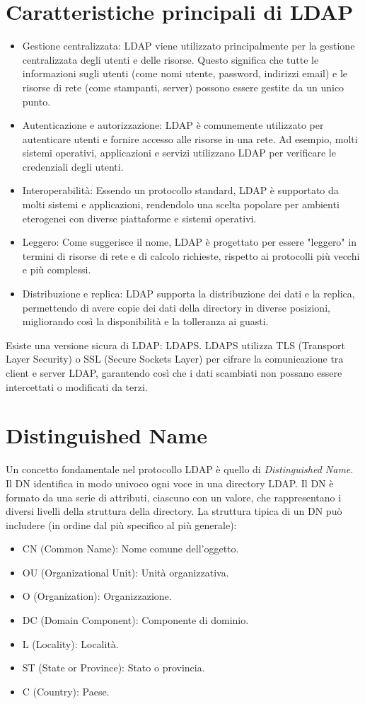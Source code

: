\documentclass[12pt]{report}
\begin{document}
\section{Caratteristiche principali di LDAP}
\begin{itemize}
    \item Gestione centralizzata: LDAP viene utilizzato principalmente per la gestione centralizzata degli utenti e delle risorse. Questo significa che tutte le informazioni sugli utenti (come nomi utente, password, indirizzi email) e le risorse di rete (come stampanti, server) possono essere gestite da un unico punto.
    \item Autenticazione e autorizzazione: LDAP è comunemente utilizzato per autenticare utenti e fornire accesso alle risorse in una rete. Ad esempio, molti sistemi operativi, applicazioni e servizi utilizzano LDAP per verificare le credenziali degli utenti.
    \item Interoperabilità: Essendo un protocollo standard, LDAP è supportato da molti sistemi e applicazioni, rendendolo una scelta popolare per ambienti eterogenei con diverse piattaforme e sistemi operativi.
    \item Leggero: Come suggerisce il nome, LDAP è progettato per essere "leggero" in termini di risorse di rete e di calcolo richieste, rispetto ai protocolli più vecchi e più complessi.
    \item Distribuzione e replica: LDAP supporta la distribuzione dei dati e la replica, permettendo di avere copie dei dati della directory in diverse posizioni, migliorando così la disponibilità e la tolleranza ai guasti.
\end{itemize}
Esiste una versione sicura di LDAP: LDAPS. LDAPS utilizza TLS (Transport Layer Security) o SSL (Secure Sockets Layer) per cifrare la comunicazione tra client e server LDAP, garantendo così che i dati scambiati non possano essere intercettati o modificati da terzi.
\section{Distinguished Name}
Un concetto fondamentale nel protocollo LDAP è quello di \textit{Distinguished Name}. Il DN identifica in modo univoco ogni voce in una directory LDAP.
Il DN è formato da una serie di attributi, ciascuno con un valore, che rappresentano i diversi livelli della struttura della directory. La struttura tipica di un DN può includere (in ordine dal più specifico al più generale):
\begin{itemize}
    \item CN (Common Name): Nome comune dell'oggetto.
    \item OU (Organizational Unit): Unità organizzativa.
    \item O (Organization): Organizzazione.
    \item DC (Domain Component): Componente di dominio.
    \item L (Locality): Località.
    \item ST (State or Province): Stato o provincia.
    \item C (Country): Paese.\cite{distinguished-name}
\end{itemize}
\end{document}
